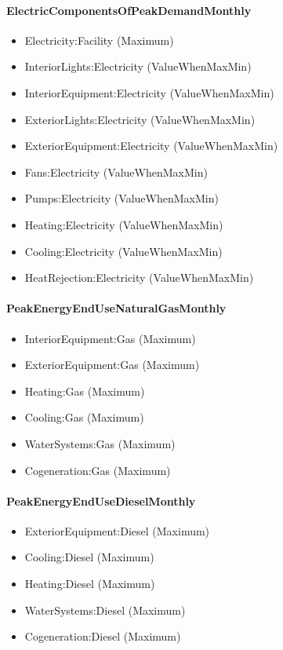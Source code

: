 \paragraph{ElectricComponentsOfPeakDemandMonthly}\label{electriccomponentsofpeakdemandmonthly}

\begin{itemize}
\item
  Electricity:Facility (Maximum)
\item
  InteriorLights:Electricity (ValueWhenMaxMin)
\item
  InteriorEquipment:Electricity (ValueWhenMaxMin)
\item
  ExteriorLights:Electricity (ValueWhenMaxMin)
\item
  ExteriorEquipment:Electricity (ValueWhenMaxMin)
\item
  Fans:Electricity (ValueWhenMaxMin)
\item
  Pumps:Electricity (ValueWhenMaxMin)
\item
  Heating:Electricity (ValueWhenMaxMin)
\item
  Cooling:Electricity (ValueWhenMaxMin)
\item
  HeatRejection:Electricity (ValueWhenMaxMin)
\end{itemize}

\paragraph{PeakEnergyEndUseNaturalGasMonthly}\label{peakenergyendusenaturalgasmonthly}

\begin{itemize}
\item
  InteriorEquipment:Gas (Maximum)
\item
  ExteriorEquipment:Gas (Maximum)
\item
  Heating:Gas (Maximum)
\item
  Cooling:Gas (Maximum)
\item
  WaterSystems:Gas (Maximum)
\item
  Cogeneration:Gas (Maximum)
\end{itemize}

\paragraph{PeakEnergyEndUseDieselMonthly}\label{peakenergyendusedieselmonthly}

\begin{itemize}
\item
  ExteriorEquipment:Diesel (Maximum)
\item
  Cooling:Diesel (Maximum)
\item
  Heating:Diesel (Maximum)
\item
  WaterSystems:Diesel (Maximum)
\item
  Cogeneration:Diesel (Maximum)
\end{itemize}


